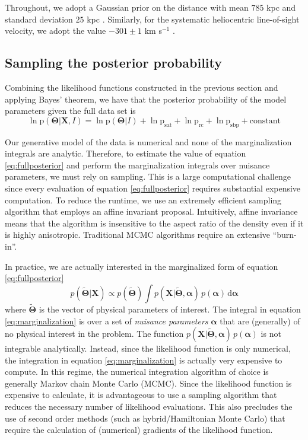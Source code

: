 \documentclass[preprint]{aastex}
\newcommand{\eqlabel}[1]{\label{eq:#1}}
\newcommand{\eq}[1]{equation \ref{eq:#1}}
\newcommand{\dd}{\mathrm{d}}
\begin{document}
Throughout, we adopt a Gaussian prior on the distance with mean $785$ kpc and
standard deviation $25$ kpc \citep{McConnachie:2005,McConnachie:2006}.  Similarly,
for the systematic heliocentric line-of-sight velocity, we adopt the value
$-301 \pm 1$ km s$^{-1}$ \citep{Courteau:1999}.

\subsection{Sampling the posterior probability}

Combining the likelihood functions constructed in the previous section and
applying Bayes' theorem, we have that the posterior probability of the model
parameters given the full data set is
\begin{equation}
    \eqlabel{fullposterior}
    \ln \mathrm{p} (\mathbf{\Theta} | \mathbf{X}, I) =
    \ln \mathrm{p} (\mathbf{\Theta} | I) +  \ln \mathrm{p}_\mathrm{sat}
    + \ln \mathrm{p}_\mathrm{rc}
    + \ln \mathrm{p}_\mathrm{sbp} + \mathrm{constant}
\end{equation}

Our generative model of the data is numerical and none of the marginalization
integrals are analytic. Therefore, to estimate the value of \eq{fullposterior}
and perform the marginalization integrals over nuisance parameters, we must
rely on sampling. This is a large computational challenge since every evaluation
of \eq{fullposterior} requires substantial expensive computation. To reduce the
runtime, we use an extremely efficient sampling algorithm that employs an affine
invariant proposal. Intuitively, affine invariance means that the algorithm is
insensitive to the aspect ratio of the density even if it is highly anisotropic.
Traditional MCMC algorithms require an extensive ``burn-in''.

In practice, we are actually interested in the marginalized form of \eq{fullposterior}
\begin{equation}
    \eqlabel{marginalization}
    p (\tilde{\boldsymbol{\Theta}} | \mathbf{X}) \propto
        p (\tilde{\boldsymbol{\Theta}}) \int
        p (\mathbf{X} | \tilde{\boldsymbol{\Theta}},\boldsymbol{\alpha}) \,
        p (\boldsymbol{\alpha}) \, \dd \boldsymbol{\alpha}
\end{equation}
where $\tilde{\boldsymbol{\Theta}}$ is the vector of physical parameters of
interest. The integral in
\eq{marginalization} is over a set of \emph{nuisance parameters} $\boldsymbol{\alpha}$
that are (generally) of no physical interest in the problem. The function
$p (\mathbf{X} | \tilde{\boldsymbol{\Theta}},\boldsymbol{\alpha}) \, p (\boldsymbol{\alpha})$
is not integrable analytically. Instead, since the likelihood function is only
numerical, the integration in \eq{marginalization} is actually very expensive
to compute. In this regime, the numerical integration algorithm of choice is
generally Markov chain Monte Carlo (MCMC).
Since the likelihood function is expensive to calculate, it is advantageous to
use a sampling algorithm that reduces the necessary number of likelihood
evaluations. This also precludes the use of second order methods (such as
hybrid/Hamiltonian Monte Carlo) that require the calculation of (numerical)
gradients of the likelihood function.
\end{document}
